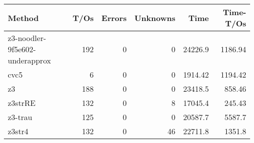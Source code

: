 \begin{tabular}{lrrrrr}
\hline
 Method                         &   T/Os &   Errors &   Unknowns &     Time &   Time-T/Os \\
\hline
 z3-noodler-9f5e602-underapprox &    192 &        0 &          0 & 24226.9  &     1186.94 \\
 cvc5                           &      6 &        0 &          0 &  1914.42 &     1194.42 \\
 z3                             &    188 &        0 &          0 & 23418.5  &      858.46 \\
 z3strRE                        &    132 &        0 &          8 & 17045.4  &      245.43 \\
 z3-trau                        &    125 &        0 &          0 & 20587.7  &     5587.7  \\
 z3str4                         &    132 &        0 &         46 & 22711.8  &     1351.8  \\
\hline
\end{tabular}
